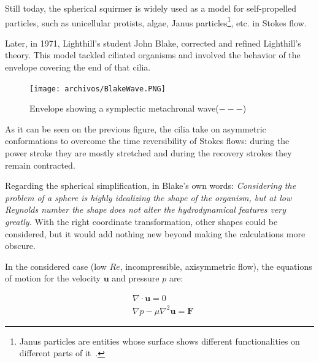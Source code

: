 Still today, the spherical squirmer is widely used as a model for self-propelled particles, such as unicellular protists, algae, Janus particles\footnote{Janus particles are entities whose surface shows different functionalities on different parts of it~\cite{PGG}.}, etc. in Stokes flow.

Later, in 1971, Lighthill’s student John Blake,  corrected and refined Lighthill's theory. This model tackled ciliated organisms and involved the behavior of the envelope covering the end of that cilia. 

\begin{figure}[H]
	\centering
	\texttt{[image: archivos/BlakeWave.PNG]}
	\caption[Caption for LOF]{Envelope showing a symplectic metachronal wave\protect\footnotemark ($---$)~\cite{Pedley}}
	\label{symplectic_wave}
\end{figure}

As it can be seen on the previous figure, the cilia take on asymmetric conformations to overcome the time reversibility of Stokes flows: during the power stroke they are mostly stretched and during the recovery strokes they remain contracted.

Regarding the spherical simplification, in Blake's own words: \textit{Considering the problem of a sphere is highly idealizing the shape of the organism, but at low Reynolds number the shape does not alter the hydrodynamical features very greatly.} With the right coordinate transformation, other shapes could be considered, but it would add nothing new beyond making the calculations more obscure.


In the considered case (low $Re$, incompressible, axisymmetric flow), the equations of motion for the velocity $\mathbf{u}$ and pressure $p$ are: 

\begin{equation}
\begin{aligned} & \nabla \cdot \mathbf{u}=0 \\
& \nabla p-\mu \nabla^{2} \mathbf{u}=\mathbf{F} \label{stokes_f} \end{aligned}
\end{equation}

